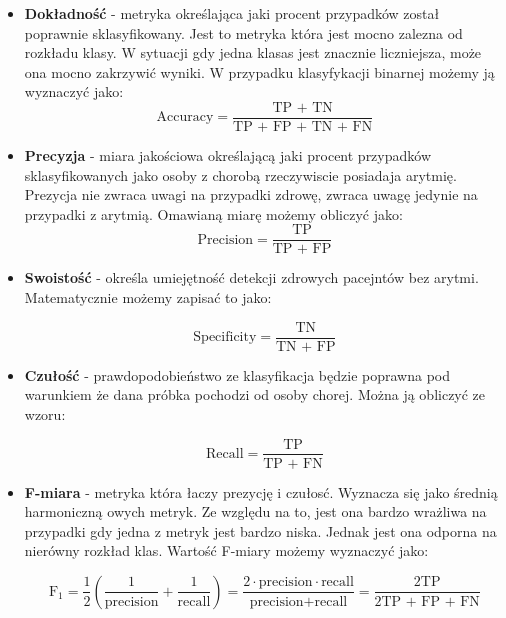 \documentclass[a4paper,twoside,12pt]{book}
\begin{document}
\begin{itemize}
	\item \textbf{Dokładność} - metryka określająca jaki procent przypadków został poprawnie sklasyfikowany. Jest to metryka która jest mocno zalezna od rozkładu klasy. W sytuacji gdy jedna klasas jest znacznie liczniejsza, może ona mocno zakrzywić wyniki. W przypadku klasyfykacji binarnej możemy ją wyznaczyć jako:
	      \begin{equation}
		      \text{Accuracy} = \frac{\text{TP + TN}}{\text{TP + FP + TN + FN}}
	      \end{equation}

	\item \textbf{Precyzja} - miara jakościowa określającą jaki procent przypadków sklasyfikowanych jako osoby z chorobą rzeczywiscie posiadaja arytmię. Prezycja nie zwraca uwagi na przypadki zdrowę, zwraca uwagę jedynie na przypadki z arytmią. Omawianą miarę możemy obliczyć jako:
	      \begin{equation}
		      \text{Precision} = \frac{\text{TP}}{\text{TP + FP}}
	      \end{equation}

	\item \textbf{Swoistość} - określa umiejętność detekcji zdrowych pacejntów bez arytmi. Matematycznie możemy zapisać to jako:

	      \begin{equation}
		      \text{Specificity} = \frac{\text{TN}}{\text{TN + FP}}
	      \end{equation}
	\item \textbf{Czułość} - prawdopodobieństwo ze klasyfikacja będzie poprawna pod warunkiem że dana próbka pochodzi od osoby chorej. Można ją obliczyć ze wzoru:

	      \begin{equation}
		      \text{Recall} = \frac{\text{TP}}{\text{TP + FN}}
	      \end{equation}


	\item \textbf{F-miara} - metryka która łaczy prezycję i czułosć. Wyznacza się jako średnią harmoniczną owych metryk. Ze względu na to, jest ona bardzo wrażliwa na przypadki gdy jedna z metryk jest bardzo niska. Jednak jest ona odporna na nierówny rozkład klas. Wartość F-miary możemy wyznaczyć jako:

	      \begin{equation}
		      \text{F}_1 = \frac{1}{2} \left( \frac{1}{\text{precision}} + \frac{1}{\text{recall}} \right) = \frac{2 \cdot \text{precision} \cdot \text{recall}}{\text{precision} + \text{recall}} = \frac{\text{2TP}}{\text{2TP + FP + FN}}
	      \end{equation}



\end{itemize}
\end{document}
